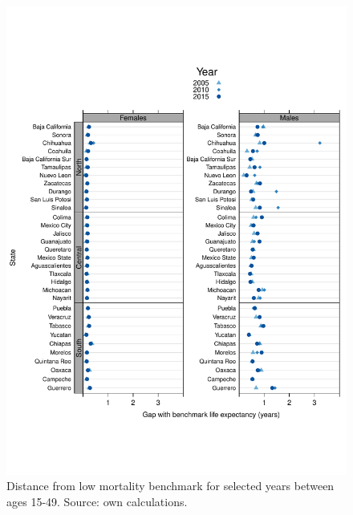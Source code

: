 \documentclass[11.5pt]{article}
\begin{document}
{\begin{figure}
\centering
\caption{Distance from low mortality benchmark for selected years between ages 15-49. Source: own calculations.}
\begin{center}
\includegraphics[scale=.5]{Distance_ya.pdf}
\end{center}
\end{figure}

}
\end{document}
